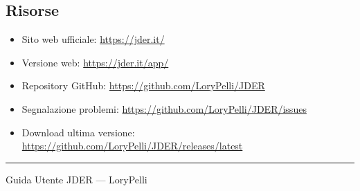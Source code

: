\documentclass[a4paper,11pt]{article}
\newcommand\mediumweight{\fontseries{mb}\selectfont}
\newcommand\jder{{\mediumweight JDER}}
\newcommand\theauthor{LoryPelli}
\begin{document}
\subsection*{Risorse}
\begin{itemize}
  \item Sito web ufficiale: \url{https://jder.it/}
  \item Versione web: \url{https://jder.it/app/}
  \item Repository GitHub: \url{https://github.com/LoryPelli/JDER}
  \item Segnalazione problemi: \url{https://github.com/LoryPelli/JDER/issues}
  \item Download ultima versione: \url{https://github.com/LoryPelli/JDER/releases/latest}
\end{itemize}

\bigskip
{\color{m3outlinevariant}\rule{\linewidth}{0.5pt}}\par
{\centering\color{m3onsurfacevariant}Guida Utente \jder{} --- \theauthor\par}
\end{document}
